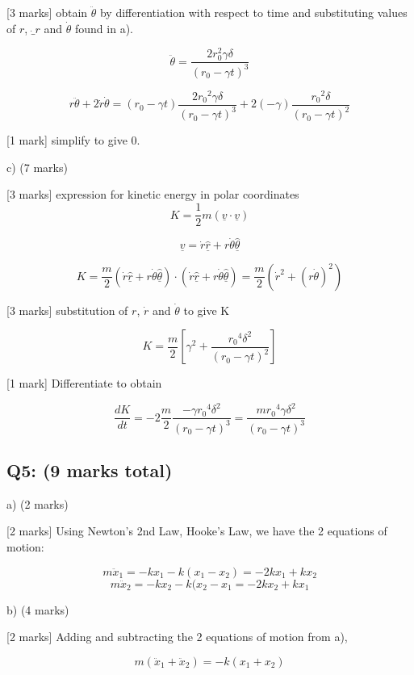 \documentclass[a4paper,11pt]{article}
\begin{document}
[3 marks] obtain \( \ddot{\theta} \) by differentiation with respect to time and substituting values of \( r \), \( \dot_{r} \) and \( \dot{\theta} \) found in a). 

\[ \ddot{\theta} = \frac{2r_0^2 \gamma \delta}{(r_0 - \gamma t)^3} \]

\[ r \ddot{\theta} + 2\dot{r}\dot{\theta} = (r_0 - \gamma t) \frac{2{r_0}^2 \gamma \delta}{(r_0 - \gamma t)^3} + 2 (- \gamma) \frac{{r_0}^2 \delta}{(r_0 - \gamma t)^2}  \]

[1 mark] simplify to give 0. 

c) (7 marks)

[3 marks] expression for kinetic energy in polar coordinates 
\[ K = \frac{1}{2}m (\underline{v} \cdot \underline{v} ) \]

\[ \underline{v} = \dot{r} \underline{\hat{r}} + r \dot{\theta} \underline{\hat{\theta}} \]

\[ K = \frac{m}{2} \left ( \dot{r} \underline{\hat{r}} + r \dot{\theta} \underline{\hat{\theta}} \right ) \cdot \left ( \dot{r} \underline{\hat{r}} + r \dot{\theta} \underline{\hat{\theta}} \right ) = \frac{m}{2} \left ( \dot{r}^2 + (r \dot{\theta})^2 \right ) \]

[3 marks] substitution of \( r \), \( \dot{r} \) and \( \dot{\theta} \) to give K 

\[ K = \frac{m}{2} \left [ \gamma^2 + \frac{{r_0}^4 \delta^2}{(r_0 - \gamma t)^2} \right ] \]

[1 mark] Differentiate to obtain 

\[ \frac{dK}{dt} = -2 \frac{m}{2}\frac{-\gamma {r_0}^4 \delta^2}{(r_0 - \gamma t)^3} = \frac{m {r_0}^4 \gamma \delta^2}{(r_0 - \gamma t)^3} \]

\subsection*{Q5: (9 marks total)}

a) (2 marks)

[2 marks] Using Newton’s 2nd Law, Hooke’s Law, we have the 2 equations of motion: 

\[ m \ddot{x}_1 = - k x_1 - k(x_1 - x_2) = -2k x_1 + k x_2 \]
\[ m \ddot{x}_2 = - k x_2 - k(x_2 - x_1 = -2k x_2 + k x_1 \]

b) (4 marks) 

[2 marks] Adding and subtracting the 2 equations of motion from a), 

\[ m( \ddot{x}_1 + \ddot{x}_2 ) = -k(x_1 + x_2) \]
\end{document}
